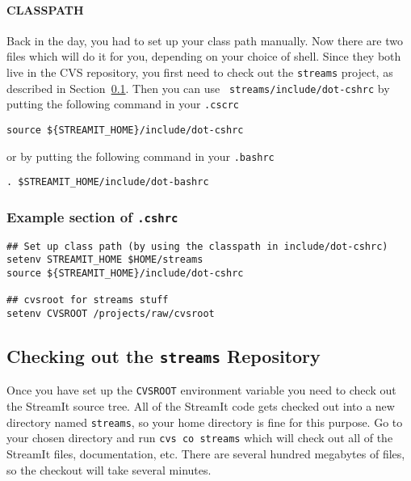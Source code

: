 \paragraph{CLASSPATH}
Back in the day, you had to set up your class path manually.  Now
there are two files which will do it for you, depending on your choice
of shell. Since they both live in the CVS repository, you first need
to check out the {\tt streams} project, as described in
Section~\ref{sec:checkout}. Then you can use {\tt
streams/include/dot-cshrc} by putting the following command in your
{\tt .cscrc}
\begin{verbatim}
source ${STREAMIT_HOME}/include/dot-cshrc
\end{verbatim}

\noindent or by putting the following command in your {\tt .bashrc}

\begin{verbatim}
. $STREAMIT_HOME/include/dot-bashrc
\end{verbatim}

\subsubsection{Example section of {\tt .cshrc}}
\begin{verbatim}
## Set up class path (by using the classpath in include/dot-cshrc)
setenv STREAMIT_HOME $HOME/streams
source ${STREAMIT_HOME}/include/dot-cshrc

## cvsroot for streams stuff
setenv CVSROOT /projects/raw/cvsroot
\end{verbatim}



\subsection{Checking out the {\tt streams} Repository}
\label{sec:checkout}
Once you have set up the {\tt CVSROOT} environment variable
you need to check out the StreamIt source tree. All of the
StreamIt code gets checked out into a new directory named
{\tt streams}, so your home directory is fine for this purpose.
Go to your chosen directory and run {\tt cvs co streams} which
will check out all of the StreamIt files, documentation, etc.
There are several hundred megabytes of files, so the checkout 
will take several minutes.



